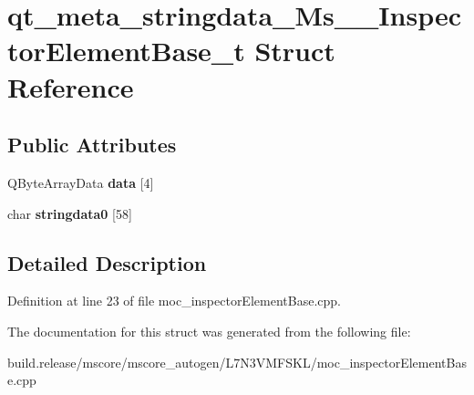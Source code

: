 \hypertarget{structqt__meta__stringdata___ms_____inspector_element_base__t}{}\section{qt\+\_\+meta\+\_\+stringdata\+\_\+\+Ms\+\_\+\+\_\+\+Inspector\+Element\+Base\+\_\+t Struct Reference}
\label{structqt__meta__stringdata___ms_____inspector_element_base__t}
\subsection*{Public Attributes}
\begin{DoxyCompactItemize}
\item 
\mbox{\label{structqt__meta__stringdata___ms_____inspector_element_base__t_af0e251aa9361c898432d3a25169ad7ef}} 
Q\+Byte\+Array\+Data {\bfseries data} \mbox{[}4\mbox{]}
\item 
\mbox{\label{structqt__meta__stringdata___ms_____inspector_element_base__t_aba39c373d0b7818a56dd6f17a73164fc}} 
char {\bfseries stringdata0} \mbox{[}58\mbox{]}
\end{DoxyCompactItemize}


\subsection{Detailed Description}


Definition at line 23 of file moc\+\_\+inspector\+Element\+Base.\+cpp.



The documentation for this struct was generated from the following file\+:\begin{DoxyCompactItemize}
\item 
build.\+release/mscore/mscore\+\_\+autogen/\+L7\+N3\+V\+M\+F\+S\+K\+L/moc\+\_\+inspector\+Element\+Base.\+cpp\end{DoxyCompactItemize}
